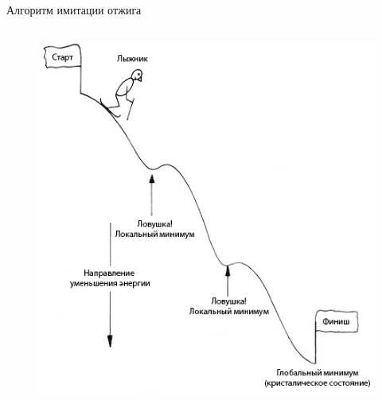 \documentclass[ignoreonframetext,unicode]{beamer}
\begin{document}
\begin{frame}{Алгоритм имитации отжига}
\begin{columns}
\begin{column}{0.5\textwidth}
\begin{figure}[!h]
\begin{center}
				\includegraphics[scale=0.4]{ski}
			\end{center}
		\end{figure}
	\end{column}
\end{columns}	
\end{frame}
\end{document}
